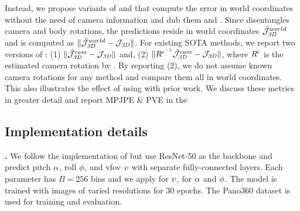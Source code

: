 \documentclass[10pt,twocolumn,letterpaper,usenames,dvipsnames]{article}
\begin{document}
Instead, we propose variants of \mpjpe and \pve that compute the error in world coordinates without the need of camera information and dub them \wmpjpe and \wpve. 
Since \methodname disentangles camera and body rotations, the predictions reside in world coordinates $\hat{\mathcal{J}}_{\mathit{3D}}^{world}$ 
and \wmpjpe is computed as $\lVert \hat{\mathcal{J}}_{\mathit{3D}}^{world} - \mathcal{J}_{\mathit{3D}} \rVert$. 
For existing SOTA methods, we report two versions of \wmpjpe: 
(1) $\lVert \hat{\mathcal{J}}_{\mathit{3D}}^{cam} - \mathcal{J}_{\mathit{3D}} \rVert$
and,
(2) $\lVert R^{c^{-1}} \hat{\mathcal{J}}_{\mathit{3D}}^{cam} - \mathcal{J}_{\mathit{3D}} \rVert$, where $R^c$ is the estimated camera rotation by \camcalib.
By reporting (2), we do not assume known camera rotations for any method and compare them all in world coordinates. 
This also illustrates the effect of using \camcalib with prior work. 
We discuss these metrics in greater detail and report MPJPE \& PVE in the \supmat

\begin{table}[]
    \centering
    \vspace{-0.05in}
    \caption{{\bf Regressing camera parameters.} \camcalib methods are trained and tested on the Pano360 dataset. ScaleNet~\cite{zhu2020single} results use the authors' implementation.
    }
    \vspace{-2ex}
    \label{tab:camcalib}
\end{table}

\subsection{Implementation details}
\label{sec:implementation}

\textbf{\camcalib.} We follow the implementation of \cite{Hold-Geoffroy_2018_CVPR,zhu2020single} but use ResNet-50 as the backbone and predict pitch $\alpha$, roll $\phi$, and vfov $\upsilon$ with separate fully-connected layers. 
Each parameter has $B=256$ bins and we apply \softbiasedltwo for $\upsilon$, \softltwo for $\alpha$ and $\phi$.
The model is trained with images of varied resolutions for 30 epochs. The Pano360 dataset is used for training and evaluation.
\end{document}
